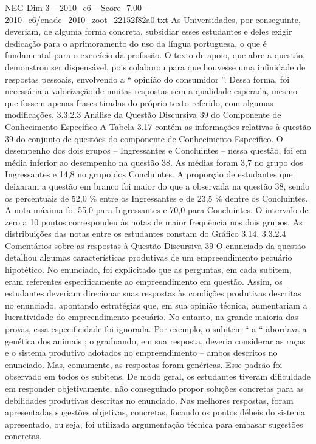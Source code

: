 \begin{textsample}{NEG Dim 3 – 2010\_c6 – Score -7.00 – 2010\_c6/enade\_2010\_zoot\_22152f82a0.txt}
As Universidades, por conseguinte, deveriam, de alguma forma concreta, subsidiar esses estudantes e deles exigir dedicação para o aprimoramento do uso da língua portuguesa, o que é fundamental para o exercício da profissão.
O texto de apoio, que abre a questão, demonstrou ser dispensável, pois colaborou para que houvesse uma infinidade de respostas pessoais, envolvendo a “ opinião do consumidor ”.
Dessa forma, foi necessária a valorização de muitas respostas sem a qualidade esperada, mesmo que fossem apenas frases tiradas do próprio texto referido, com algumas modificações. 3.3.2.3 Análise da Questão Discursiva 39 do Componente de Conhecimento Específico A Tabela 3.17 contém as informações relativas à questão 39 do conjunto de questões do componente de Conhecimento Específico.
O desempenho dos dois grupos – Ingressantes e Concluintes – nessa questão, foi em média inferior ao desempenho na questão 38.
As médias foram 3,7 no grupo dos Ingressantes e 14,8 no grupo dos Concluintes.
A proporção de estudantes que deixaram a questão em branco foi maior do que a observada na questão 38, sendo os percentuais de 52,0 \% entre os Ingressantes e de 23,5 \% dentre os Concluintes.
A nota máxima foi 55,0 para Ingressantes e 70,0 para Concluintes.
O intervalo de zero a 10 pontos correspondeu às notas de maior frequência nos dois grupos.
As distribuições das notas entre os estudantes constam do Gráfico 3.14. 3.3.2.4 Comentários sobre as respostas à Questão Discursiva 39 O enunciado da questão detalhou algumas características produtivas de um empreendimento pecuário hipotético.
No enunciado, foi explicitado que as perguntas, em cada subitem, eram referentes especificamente ao empreendimento em questão.
Assim, os estudantes deveriam direcionar suas respostas às condições produtivas descritas no enunciado, apontando estratégias que, em sua opinião técnica, aumentariam a lucratividade do empreendimento pecuário.
No entanto, na grande maioria das provas, essa especificidade foi ignorada.
Por exemplo, o subitem “ a “ abordava a genética dos animais ; o graduando, em sua resposta, deveria considerar as raças e o sistema produtivo adotados no empreendimento – ambos descritos no enunciado.
Mas, comumente, as respostas foram genéricas.
Esse padrão foi observado em todos os subitens.
De modo geral, os estudantes tiveram dificuldade em responder objetivamente, não conseguindo propor soluções concretas para as debilidades produtivas descritas no enunciado.
Nas melhores respostas, foram apresentadas sugestões objetivas, concretas, focando os pontos débeis do sistema apresentado, ou seja, foi utilizada argumentação técnica para embasar sugestões concretas.

\end{textsample}
